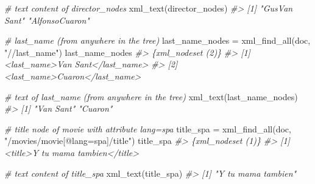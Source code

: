 \documentclass[
]{book}
\newenvironment{Shaded}{\begin{snugshade}}{\end{snugshade}}
\newcommand{\CommentTok}[1]{\textcolor[rgb]{0.56,0.35,0.01}{\textit{#1}}}
\newcommand{\FunctionTok}[1]{\textcolor[rgb]{0.00,0.00,0.00}{#1}}
\newcommand{\NormalTok}[1]{#1}
\newcommand{\OtherTok}[1]{\textcolor[rgb]{0.56,0.35,0.01}{#1}}
\newcommand{\StringTok}[1]{\textcolor[rgb]{0.31,0.60,0.02}{#1}}
\begin{document}
\begin{Shaded}
\begin{Highlighting}[]
\CommentTok{\# text content of director\_nodes}
\FunctionTok{xml\_text}\NormalTok{(director\_nodes)}
\CommentTok{\#\textgreater{} [1] "GusVan Sant"   "AlfonsoCuaron"}
\end{Highlighting}
\end{Shaded}

\begin{Shaded}
\begin{Highlighting}[]
\CommentTok{\# last\_name (from anywhere in the tree)}
\NormalTok{last\_name\_nodes }\OtherTok{=} \FunctionTok{xml\_find\_all}\NormalTok{(doc, }\StringTok{"//last\_name"}\NormalTok{)}
\NormalTok{last\_name\_nodes}
\CommentTok{\#\textgreater{} \{xml\_nodeset (2)\}}
\CommentTok{\#\textgreater{} [1] \textless{}last\_name\textgreater{}Van Sant\textless{}/last\_name\textgreater{}}
\CommentTok{\#\textgreater{} [2] \textless{}last\_name\textgreater{}Cuaron\textless{}/last\_name\textgreater{}}
\end{Highlighting}
\end{Shaded}

\begin{Shaded}
\begin{Highlighting}[]
\CommentTok{\# text of last\_name (from anywhere in the tree)}
\FunctionTok{xml\_text}\NormalTok{(last\_name\_nodes)}
\CommentTok{\#\textgreater{} [1] "Van Sant" "Cuaron"}
\end{Highlighting}
\end{Shaded}

\begin{Shaded}
\begin{Highlighting}[]
\CommentTok{\# title node of movie with attribute lang=\textquotesingle{}spa\textquotesingle{}}
\NormalTok{title\_spa }\OtherTok{=} \FunctionTok{xml\_find\_all}\NormalTok{(doc, }\StringTok{"/movies/movie[@lang=\textquotesingle{}spa\textquotesingle{}]/title"}\NormalTok{)}
\NormalTok{title\_spa}
\CommentTok{\#\textgreater{} \{xml\_nodeset (1)\}}
\CommentTok{\#\textgreater{} [1] \textless{}title\textgreater{}Y tu mama tambien\textless{}/title\textgreater{}}
\end{Highlighting}
\end{Shaded}

\begin{Shaded}
\begin{Highlighting}[]
\CommentTok{\# text content of title\_spa}
\FunctionTok{xml\_text}\NormalTok{(title\_spa)}
\CommentTok{\#\textgreater{} [1] "Y tu mama tambien"}
\end{Highlighting}
\end{Shaded}
\end{document}
